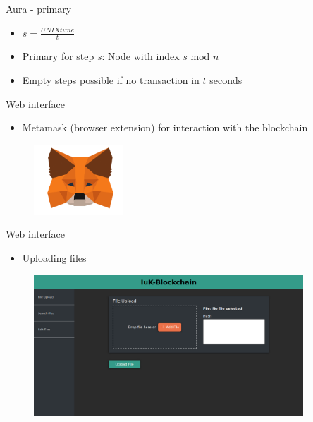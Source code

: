 \documentclass[10pt]{beamer}
\begin{document}
\begin{frame}{Aura - primary}
	\begin{itemize}
		\item $s = \frac{UNIXtime}{t}$
		\item Primary for step $s$: Node with index $s$ mod $n$
		\item Empty steps possible if no transaction in $t$ seconds
	\end{itemize}
\end{frame}

\begin{frame}{Web interface}
	\begin{itemize}
		\item Metamask (browser extension) for interaction with the blockchain
	\end{itemize}
	\begin{figure}
		\includegraphics[width=0.3\textwidth]{images/mm-logo.png}
	\end{figure}
\end{frame}

\begin{frame}{Web interface}
	\begin{itemize}
		\item Uploading files
	\end{itemize}
	\begin{figure}
		\includegraphics[width=0.9\textwidth]{images/upload.png}
	\end{figure}
\end{frame}
\end{document}
